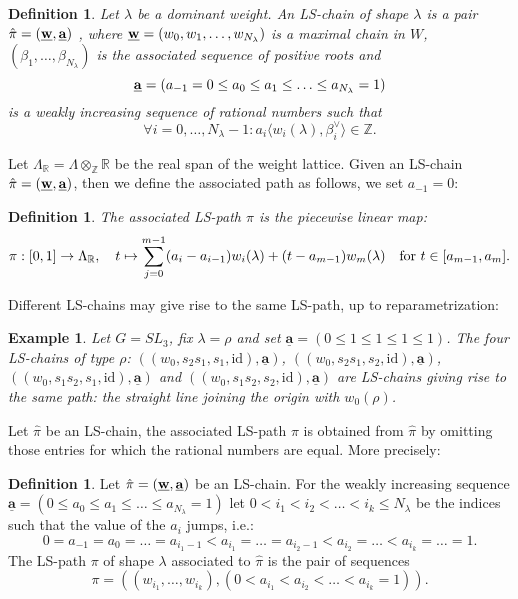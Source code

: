\documentclass{emsprocart}
\newtheorem{exam}[theorem]{Example}
\theoremstyle{definition}
\newtheorem{definition}[theorem]{Definition}
\begin{document}
\begin{definition}\label{LS-chain}\it
Let $\lambda$ be a dominant weight. An LS-chain of shape $\lambda$
is a pair $\hat\pi=(\underline{\bf w},\underline{\bf a})$ , where $\underline{\bf w}=(w_0,w_1,\ldots,w_{N_\lambda})$ is a maximal chain in $W$,
$(\beta_1,\ldots,\beta_{N_\lambda})$
is the associated sequence of positive roots and
$$
\underline{\bf a}=(a_{-1}=0\le a_0\le a_1\le\ldots\le a_{N_\lambda}=1)
$$
is a weakly increasing sequence of rational numbers such that
\begin{equation}\label{integrally}
\forall i=0,\ldots,N_\lambda-1: a_i\langle w_{i}(\lambda),\beta^\vee_i\rangle\in\mathbb Z. 
\end{equation}
\end{definition}
Let $\Lambda_{\mathbb R}=\Lambda\otimes_{\mathbb Z}\mathbb R$ be the real span of the weight lattice.
Given an LS-chain $\hat\pi=(\underline{\bf w},\underline{\bf a})$,
then we define the associated path as follows, we set $a_{-1}=0$:
\begin{definition} \it
The associated {\it LS-path $\pi$} is the piecewise linear map:
$$
\pi:[0,1]\rightarrow \Lambda_{\mathbb R},\quad t\mapsto
\sum_{j=0}^{m-1} (a_i-a_{i-1}) w_{i}(\lambda) + (t-a_{m-1})w_{m}(\lambda)\quad\hbox{for\ } t\in[a_{m-1},a_m].
$$
\end{definition}
Different LS-chains may give rise to the same LS-path, up to reparametrization:
\par\noindent
\begin{exam}\rm
Let $G=SL_3$, fix $\lambda=\rho$ and set $\underline{\mathbf a}= (0\le 1\le 1\le 1\le 1)$.
The four LS-chains of type $\rho$: $((w_0,s_2s_1,s_1,\text{id}),\underline{\mathbf a})$, $((w_0,s_2s_1,s_2,\text{id}),\underline{\mathbf a})$,
$((w_0,s_1s_2,s_1,\text{id}),\underline{\mathbf a})$
and $((w_0,s_1s_2,s_2,\text{id}),\underline{\mathbf a})$ are LS-chains
giving rise to the same path: the straight line joining the origin with $w_0(\rho)$.
\end{exam}
Let $\hat\pi$ be an LS-chain, the
associated LS-path $\pi$ is obtained from $\hat\pi$ by omitting those entries for which the rational numbers are equal.
More precisely:
\begin{definition}\label{lspath} Let
$\hat\pi=(\underline{\bf w},\underline{\bf a})$ be an LS-chain. For the weakly increasing sequence
$\underline{\mathbf a}=(0\le a_0\le a_1\le\ldots\le a_{N_\lambda}=1)$ let
$0< i_1 < i_2<\ldots <i_k\le N_{\lambda}$ be the indices such that the value of the $a_i$ jumps, i.e.:
$$
0=a_{-1}=a_0=\ldots=a_{i_1-1}<a_{i_1}=\ldots=a_{i_2-1}<a_{i_2}=\ldots <a_{i_k}=\ldots=1.
$$
The LS-path $\pi$ of shape $\lambda$ associated to $\hat\pi$ is the pair of sequences
\begin{equation}\label{path}
\pi=((w_{i_1},\ldots,w_{i_k}),(0<a_{i_1}<a_{i_2}<\ldots< a_{i_k}=1)).
\end{equation}
\end{definition}
\end{document}
